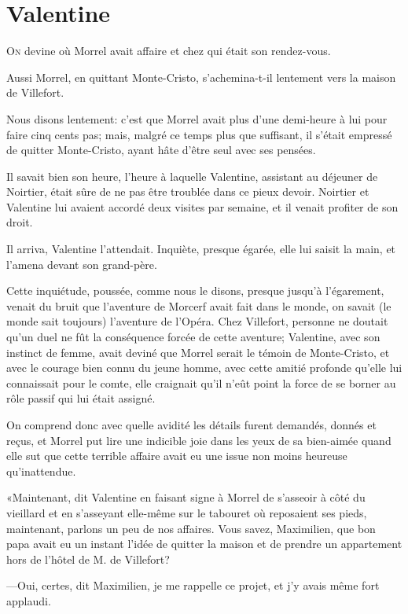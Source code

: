 \chapter{Valentine}

\lettrine{O}{n} devine où Morrel avait affaire et chez qui était son rendez-vous. 

\zz
Aussi Morrel, en quittant Monte-Cristo, s'achemina-t-il lentement vers la maison de Villefort. 

\zz
Nous disons lentement: c'est que Morrel avait plus d'une demi-heure à lui pour faire cinq cents pas; mais, malgré ce temps plus que suffisant, il s'était empressé de quitter Monte-Cristo, ayant hâte d'être seul avec ses pensées. 

Il savait bien son heure, l'heure à laquelle Valentine, assistant au déjeuner de Noirtier, était sûre de ne pas être troublée dans ce pieux devoir. Noirtier et Valentine lui avaient accordé deux visites par semaine, et il venait profiter de son droit. 

Il arriva, Valentine l'attendait. Inquiète, presque égarée, elle lui saisit la main, et l'amena devant son grand-père. 

Cette inquiétude, poussée, comme nous le disons, presque jusqu'à l'égarement, venait du bruit que l'aventure de Morcerf avait fait dans le monde, on savait (le monde sait toujours) l'aventure de l'Opéra. Chez Villefort, personne ne doutait qu'un duel ne fût la conséquence forcée de cette aventure; Valentine, avec son instinct de femme, avait deviné que Morrel serait le témoin de Monte-Cristo, et avec le courage bien connu du jeune homme, avec cette amitié profonde qu'elle lui connaissait pour le comte, elle craignait qu'il n'eût point la force de se borner au rôle passif qui lui était assigné. 

On comprend donc avec quelle avidité les détails furent demandés, donnés et reçus, et Morrel put lire une indicible joie dans les yeux de sa bien-aimée quand elle sut que cette terrible affaire avait eu une issue non moins heureuse qu'inattendue. 

«Maintenant, dit Valentine en faisant signe à Morrel de s'asseoir à côté du vieillard et en s'asseyant elle-même sur le tabouret où reposaient ses pieds, maintenant, parlons un peu de nos affaires. Vous savez, Maximilien, que bon papa avait eu un instant l'idée de quitter la maison et de prendre un appartement hors de l'hôtel de M. de Villefort? 

—Oui, certes, dit Maximilien, je me rappelle ce projet, et j'y avais même fort applaudi. 

